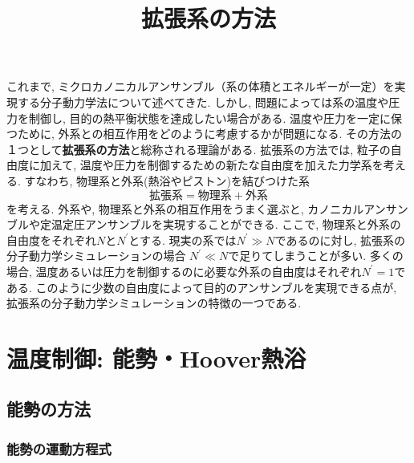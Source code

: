 





\title{拡張系の方法}
\maketitle

これまで, ミクロカノニカルアンサンブル（系の体積とエネルギーが一定）を実現する分子動力学法について述べてきた.
しかし, 問題によっては系の温度や圧力を制御し, 目的の熱平衡状態を達成したい場合がある.
温度や圧力を一定に保つために, 外系との相互作用をどのように考慮するかが問題になる.
その方法の１つとして\textbf{拡張系の方法}と総称される理論がある.
拡張系の方法では, 粒子の自由度に加えて, 温度や圧力を制御するための新たな自由度を加えた力学系を考える.
すなわち, 物理系と外系(熱浴やピストン)を結びつけた系
\begin{equation}
 \mathrm{拡張系} = \mathrm{物理系} + \mathrm{外系}
\end{equation}
を考える. 外系や, 物理系と外系の相互作用をうまく選ぶと, カノニカルアンサンブルや定温定圧アンサンブルを実現することができる.
ここで, 物理系と外系の自由度をそれぞれ$N$と$N^{\prime}$とする.
現実の系では$N^{\prime}\gg N$であるのに対し, 拡張系の分子動力学シミュレーションの場合
$N^{\prime} \ll N$で足りてしまうことが多い.
多くの場合, 温度あるいは圧力を制御するのに必要な外系の自由度はそれぞれ$N^{\prime}=1$である.
このように少数の自由度によって目的のアンサンブルを実現できる点が, 拡張系の分子動力学シミュレーションの特徴の一つである.

\section{温度制御: 能勢・Hoover熱浴}
\subsection{能勢の方法}
\subsubsection{能勢の運動方程式}

